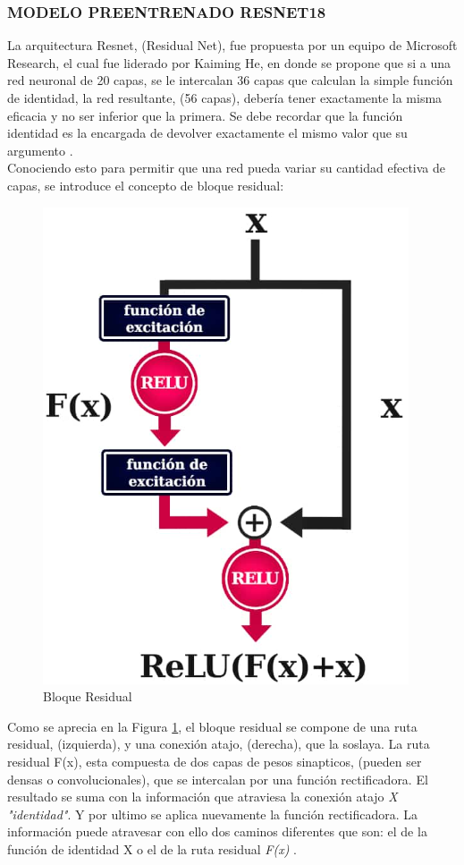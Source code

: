 		
			\newpage
			\subsubsection{\MakeUppercase{Modelo preentrenado RESNET18}}
				La arquitectura Resnet, (Residual Net), fue propuesta por un equipo de Microsoft Research, el cual fue liderado por Kaiming He, en donde se propone que si a una red neuronal de 20 capas, se le intercalan 36 capas que calculan la simple función de identidad, la red resultante, (56 capas), debería tener exactamente la misma eficacia y no ser inferior que la primera. Se debe recordar que la función identidad es la encargada de devolver exactamente el mismo valor que su argumento \cite{ref_4}.\\
				
				Conociendo esto para permitir que una red pueda variar su cantidad efectiva de capas, se introduce el concepto de bloque residual:
	
				\begin{figure}[ht]
					\centering
					\includegraphics[scale=0.6]{Figs/67.png}
					\caption{Bloque Residual}
					\label{fig:Bloque}
				\end{figure}
			
				Como se aprecia en la Figura \ref{fig:Bloque}, el bloque residual se compone de una ruta residual, (izquierda), y una conexión atajo, (derecha), que la soslaya. La ruta residual F(x), esta compuesta de dos capas de pesos sinapticos, (pueden ser densas o convolucionales), que se intercalan por una función rectificadora. El resultado se suma con la información que atraviesa la conexión atajo \textit{X "identidad"}. Y por ultimo se aplica nuevamente la función rectificadora. La información puede atravesar con ello dos caminos diferentes que son: el de la función de identidad X o el de la ruta residual \textit{F(x)} \cite{ref_5}.


